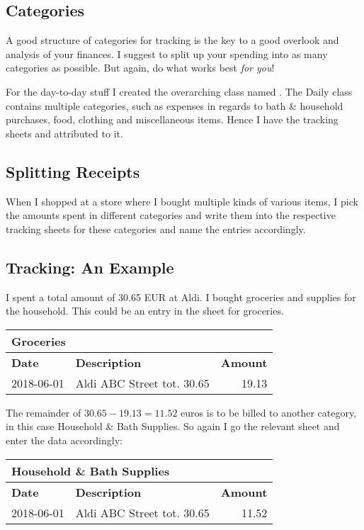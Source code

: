 \subsection{Categories}
\label{subsec:tracking-categories}

A good structure of categories for tracking is the key to a good overlook and analysis of your finances.
I suggest to split up your spending into as many categories as possible.
But again, do what works best \emph{for you}!

For the day-to-day stuff I created the overarching class named .
The Daily class contains multiple categories, such as expenses in regards to bath \& household purchases, food, clothing and miscellaneous items.
Hence I have the tracking sheets  and  attributed to it.

\subsection{Splitting Receipts}
\label{subsec:splitting-receipts}

When I shopped at a store where I bought multiple kinds of various items, I pick the amounts spent in different categories and write them into the respective tracking sheets for these categories and name the entries accordingly.

\subsection{Tracking: An Example}
\label{subsec:tracking-example}

I spent a total amount of 30.65 EUR at Aldi.
I bought groceries and supplies for the household.
This could be an entry in the sheet for groceries.
\begin{center}\sffamily
	\begin{tabular}{|l|l|r|}
		\multicolumn{3}{l}{Groceries}\\
		\hline
		\textbf{Date} & \textbf{Description} & \textbf{Amount}\rmfamily\\
		\hline
		2018-06-01 & Aldi ABC Street tot. 30.65 & 19.13\\
		\hline
	\end{tabular}
\end{center}
The remainder of \( 30.65 - 19.13 = 11.52 \) euros is to be billed to another category, in this case Household \& Bath Supplies.
So again I go the relevant sheet and enter the data accordingly:
\begin{center}\sffamily
	\begin{tabular}{|l|l|r|}
		\multicolumn{3}{l}{Household \& Bath Supplies}\\			
		\hline
		\textbf{Date} & \textbf{Description} & \textbf{Amount}\\
		\hline
		2018-06-01 & Aldi ABC Street tot. 30.65 & 11.52\\
		\hline
	\end{tabular}
\end{center}

